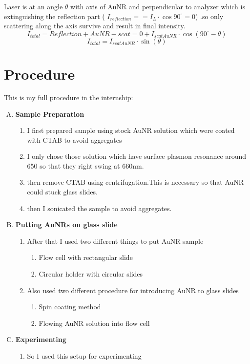 \documentclass[twoside,single]{lion-msc}
\begin{document}
Laser is at an angle $\theta$ with axis of AuNR and perpendicular to analyzer which is extinguishing the reflection part (
$ I_{reflection} = = I_{L}\cdot\cos90^{\circ} = 0$) .so only scattering along the axis survive and result in final intensity.
$$
I_{total} = Reflection+AuNR-scat = 0 +   I_{scatAuNR}\cdot\cos(90^{\circ}-\theta)
$$
$$
I_{total} = I_{scatAuNR}\cdot\sin(\theta)
$$
\section{Procedure}
This is my full procedure in the internship:
\begin{enumerate}[A.]
\item \textbf{Sample Preparation}
 \begin{enumerate}[I]
   \item I first prepared sample using stock AuNR solution which were coated with CTAB to avoid aggregates
   \item I only chose those solution which have surface plasmon resonance around 650 so that they right swing at 660nm.
   \item then remove CTAB using centrifugation.This is necessary so that AuNR could stuck glass slides.
   \item then I sonicated the sample to avoid aggregates.
   \end{enumerate}
   \item \textbf{Putting AuNRs on glass slide}
   \begin{enumerate}[I]
   \item After that I used two different things to put AuNR sample
   \begin{enumerate}[i]
   \item Flow cell with rectangular slide
   \item Circular holder with circular slides
   \end{enumerate}
   \item Also used two different procedure for introducing AuNR to glass slides
   \begin{enumerate}[i]
   \item Spin coating method 
   \item Flowing AuNR solution into flow cell
   \end{enumerate}
   \end{enumerate}
   \item \textbf{Experimenting}
     \begin{enumerate}[I]
   \item So I used this setup for experimenting

\end{enumerate}
\end{enumerate}
\end{document}
